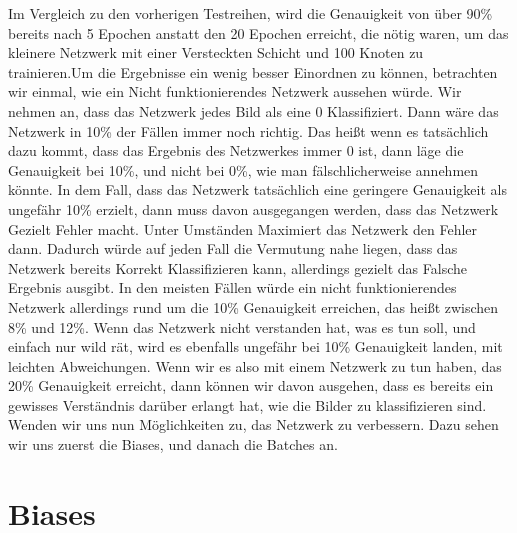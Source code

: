 \documentclass[12pt]{article}
\begin{document}
Im Vergleich zu den vorherigen Testreihen, wird die Genauigkeit von über 90\% bereits nach 5 Epochen anstatt den 20 Epochen erreicht, die nötig waren, um das kleinere Netzwerk mit einer Versteckten Schicht und 100 Knoten zu trainieren.Um die Ergebnisse ein wenig besser Einordnen zu können, betrachten wir einmal, wie ein Nicht funktionierendes Netzwerk aussehen würde. Wir nehmen an, dass das Netzwerk jedes Bild als eine 0 Klassifiziert. Dann wäre das Netzwerk in 10\% der Fällen immer noch richtig. Das heißt wenn es tatsächlich dazu kommt, dass das Ergebnis des Netzwerkes immer 0 ist, dann läge die Genauigkeit bei 10\%, und nicht bei 0\%, wie man fälschlicherweise annehmen könnte. In dem Fall, dass das Netzwerk tatsächlich eine geringere Genauigkeit als ungefähr 10\% erzielt, dann muss davon ausgegangen werden, dass das Netzwerk Gezielt Fehler macht. Unter Umständen Maximiert das Netzwerk den Fehler dann. Dadurch würde auf jeden Fall die Vermutung nahe liegen, dass das Netzwerk bereits Korrekt Klassifizieren kann, allerdings gezielt das Falsche Ergebnis ausgibt. In den meisten Fällen würde ein nicht funktionierendes Netzwerk allerdings rund um die 10\% Genauigkeit erreichen, das heißt zwischen 8\% und 12\%. Wenn das Netzwerk nicht verstanden hat, was es tun soll, und einfach nur wild rät, wird es ebenfalls ungefähr bei 10\% Genauigkeit landen, mit leichten Abweichungen. Wenn wir es also mit einem Netzwerk zu tun haben, das 20\% Genauigkeit erreicht, dann können wir davon ausgehen, dass es bereits ein gewisses Verständnis darüber erlangt hat, wie die Bilder zu klassifizieren sind. Wenden wir uns nun Möglichkeiten zu, das Netzwerk zu verbessern. Dazu sehen wir uns zuerst die Biases, und danach die Batches an.\section{ Biases}
\end{document}
